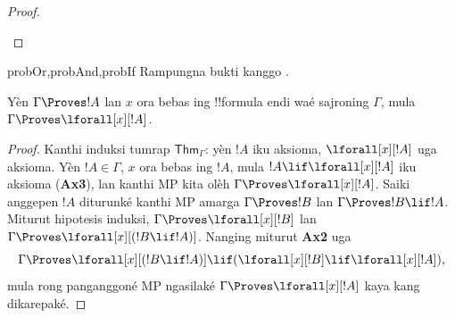 \documentclass[../../../include/open-logic-section]{subfiles}
\begin{document}
\begin{proof}
\begin{enumerate}

\end{enumerate} 
\end{proof}

\begin{probtag}{probOr,probAnd,probIf} Rampungna bukti kanggo
. 
\end{probtag}

\begin{thm}[Generalisasi]  Yèn $\Gamma \Proves
!A$ lan $x$ ora bebas ing !!{formula} endi waé sajroning $\Gamma$,
mula $\Gamma \Proves \lforall[x][!A]$.
\end{thm}

\begin{proof} Kanthi induksi tumrap $\mathsf{Thm}_\Gamma$: yèn $!A$
iku aksioma, $\lforall[x][!A]$ uga aksioma. Yèn $!A\in \Gamma$,
$x$ ora bebas ing $!A$, mula $!A \lif \lforall[x][!A]$
iku aksioma (\textbf{Ax3}), lan kanthi MP kita olèh $\Gamma
\Proves \lforall[x][!A]$. Saiki anggepen $!A$ diturunké kanthi MP
amarga $\Gamma \Proves !B$ lan $\Gamma \Proves !B \lif !A$.
Miturut hipotesis induksi, $\Gamma \Proves \lforall[x][!B]$
lan $\Gamma \Proves \lforall[x][( !B \lif !A)]$.
Nanging miturut \textbf{Ax2} uga \[ \Gamma \Proves
\lforall[x][( !B \lif !A)] \lif (\lforall[x][ !B] \lif \lforall[x][!A]), \]
mula rong panganggoné MP ngasilaké $\Gamma \Proves
\lforall[x][!A]$ kaya kang dikarepaké. \end{proof}
\end{document}
